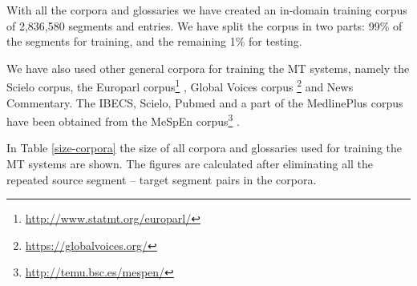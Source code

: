 \documentclass[output=paper]{langsci/langscibook}
\begin{document}
With all the corpora and glossaries we have created an in-domain training corpus of 2,836,580 segments and entries. We have split the corpus in two parts: 99\% of the segments for training, and the remaining 1\% for testing.

We have also used other general corpora for training the MT systems, namely the Scielo corpus, the Europarl corpus\footnote{\url{http://www.statmt.org/europarl/}} \citep{koehn2005europarl}, Global Voices corpus \footnote{\url{https://globalvoices.org/}} and News Commentary. The IBECS, Scielo, Pubmed and a part of the MedlinePlus corpus have been obtained from the MeSpEn corpus\footnote{\url{http://temu.bsc.es/mespen/}} \citep{articlev}.





In Table \ref{size-corpora} the size of all corpora and glossaries used for training the MT systems are shown. The figures are calculated after eliminating all the repeated source segment -- target segment pairs in the corpora.
\end{document}
